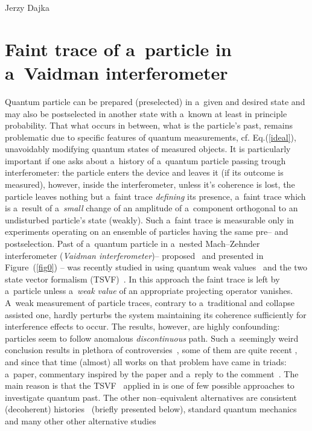 \begin{artengenv}{Jerzy Dajka}
\section{Faint trace of a~particle in a~Vaidman interferometer}



Quantum particle can be prepared (preselected) in a~given and desired state and may also be postselected in another state with a~known at least in principle probability. That what occurs in between, what is the particle's past, remains problematic due to specific features of quantum measurements, cf. Eq.(\ref{ideal}), unavoidably modifying quantum states of measured objects. It is particularly important if one asks about a~history of a~quantum particle passing trough interferometer: the particle enters the device and leaves it (if its outcome is measured), however, inside the interferometer, unless it's coherence is lost, the particle leaves nothing but a~faint trace {\it defining} its presence, a~faint trace which
is a~result of a~{\it small} change of an amplitude of a~component orthogonal to an undisturbed particle's state (weakly). Such a~faint trace is measurable  only in experiments operating on an
ensemble of particles having the same pre-- and postselection.
%
%
Past of a~quantum particle in a~nested Mach--Zehnder interferometer ({\it Vaidman interferometer})-- proposed~\parencite{PhysRevA.87.052104} and presented in Figure~(\ref{fig0})  -- was recently studied in \parencite{PhysRevA.87.052104} using 
quantum weak values~\parencite{primus,weak,Aharonov2008} and the two state vector formalism (TSVF)~\parencite{Aharonov2008}. In this approach the faint trace is left by a~particle unless a~{\it weak value} of an appropriate projecting operator vanishes. A~weak measurement of particle traces, contrary to a~traditional and collapse assisted one, hardly perturbs the system maintaining its coherence sufficiently for interference effects to occur. The results, however, are highly confounding:  particles seem to follow anomalous {\it discontinuous} path. Such a~seemingly weird conclusion results in plethora of controversies~\parencite{PhysRevA.88.046102,PhysRevA.88.046103}, some of them are quite recent \parencite[cf.][]{lady}, and since that time  (almost) all  works  on that problem  have came in triads: a~paper, commentary inspired by the paper and a~reply to the comment~\parencite{PhysRevA.88.046102,PhysRevA.88.046103}.  
The main reason is that the TSVF~\parencite{Aharonov2008} applied in \parencite{PhysRevA.87.052104} is one of few possible approaches to investigate quantum past. The other non--equivalent alternatives are consistent (decoherent) histories~\parencite{PhysRevA.94.032115,PhysRevA.95.066101} (briefly presented below), standard quantum mechanics~\parencite{PhysRevA.96.022126,PhysRevA.99.026103,PhysRevA.99.026104} and many other other alternative studies

\end{artengenv}
